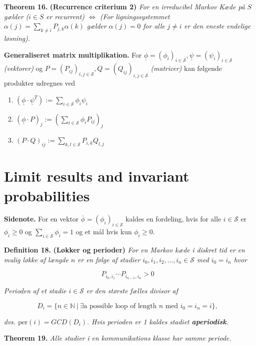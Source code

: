 \documentclass[a4paper,10pt,openany]{book}
\providecommand{\tightlist}{%
 \setlength{\itemsep}{0pt}\setlength{\parskip}{0pt}}
\begin{document}
\textbf{Theorem 16.} \textbf{(Recurrence criterium 2)} \emph{For en irreducibel Markov Kæde på \(S\) gælder (\(i\in S\) er recurrent) \(\Leftrightarrow\) (For ligningssystemmet \(\alpha(j)=\sum_{k\ne i}P_{j,k}\alpha(k)\) gælder \(\alpha(j)=0\) for alle \(j\ne i\) er den eneste endelige løsning).}

\textbf{Generaliseret matrix multiplikation.} For \(\underline{\phi}=(\phi_i)_{i\in\mathcal{S}},\underline{\psi}=(\psi_i)_{i\in\mathcal{S}}\) \emph{(vektorer)} og \(P=(P_{ij})_{i,j\in\mathcal{S}},Q=(Q_{ij})_{i,j\in\mathcal{S}}\) \emph{(matricer)} kan følgende produkter udregnes ved

\begin{enumerate}
\def\labelenumi{\roman{enumi}.}
\tightlist
\item
  \((\underline{\phi}\cdot \underline{\psi}^T):=\sum_{i\in\mathcal{S}}\phi_i\psi_i\)
\item
  \((\underline{\phi}\cdot P)_j:=\left(\sum_{i\in\mathcal{S}}\phi_i P_{ij}\right)_j\)
\item
  \((P\cdot Q)_{ij}:=\sum_{k,l\in\mathcal{S}}P_{i,k}Q_{l,j}\)
\end{enumerate}

\hypertarget{limit-results-and-invariant-probabilities}{%
\section{Limit results and invariant probabilities}\label{limit-results-and-invariant-probabilities}}

\textbf{Sidenote.} For en vektor \(\overline{\phi}=(\phi_i)_{i\in \mathcal{S}}\) kaldes en fordeling, hvis for alle \(i\in\mathcal{S}\) er \(\phi_i\ge0\) og \(\sum_{i\in\mathcal{S}}\phi_i=1\) og et mål hvis kun \(\phi_i\ge 0\).

\textbf{Definition 18.} \textbf{(Løkker og perioder)} \emph{For en Markov kæde i diskret tid er en mulig løkke af længde \(n\) er en følge af stadier \(i_0,i_1,i_2,...,i_n\in\mathcal{S}\) med \(i_0=i_n\) hvor}

\[
P_{i_0,i_1}\cdots P_{i_{n-1},i_n}>0
\]

\emph{Perioden af et stadie \(i\in\mathcal{S}\) er den største fælles divisor af}

\[
D_i=\{n\in\mathbb{N}\ \vert\ \exists \text{a possible loop of length $n$ med $i_0=i_n=i$}\},
\]

\emph{dvs. \(\text{per}(i)=GCD(D_i)\). Hvis perioden er 1 kaldes stadiet \textbf{aperiodisk}.}

\textbf{Theorem 19.} \emph{Alle stadier i en kommunikations klasse har samme periode.}
\end{document}
